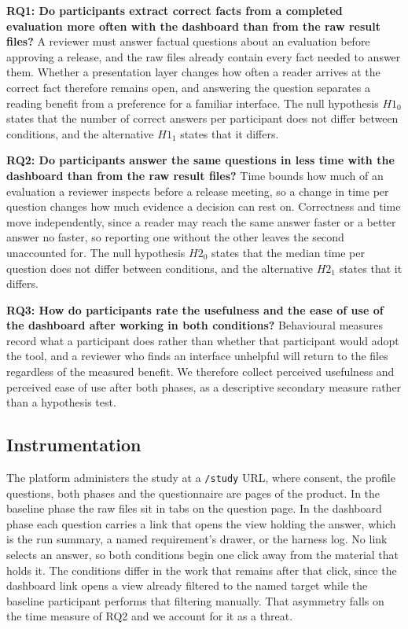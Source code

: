 \documentclass[10pt,conference]{IEEEtran}
\begin{document}
\textbf{RQ1: Do participants extract correct facts from a completed evaluation more often with the dashboard than from the raw result files?}
A reviewer must answer factual questions about an evaluation before approving a release, and the raw files already contain every fact needed to answer them.
Whether a presentation layer changes how often a reader arrives at the correct fact therefore remains open, and answering the question separates a reading benefit from a preference for a familiar interface.
The null hypothesis $H1_0$ states that the number of correct answers per participant does not differ between conditions, and the alternative $H1_1$ states that it differs.

\textbf{RQ2: Do participants answer the same questions in less time with the dashboard than from the raw result files?}
Time bounds how much of an evaluation a reviewer inspects before a release meeting, so a change in time per question changes how much evidence a decision can rest on.
Correctness and time move independently, since a reader may reach the same answer faster or a better answer no faster, so reporting one without the other leaves the second unaccounted for.
The null hypothesis $H2_0$ states that the median time per question does not differ between conditions, and the alternative $H2_1$ states that it differs.

\textbf{RQ3: How do participants rate the usefulness and the ease of use of the dashboard after working in both conditions?}
Behavioural measures record what a participant does rather than whether that participant would adopt the tool, and a reviewer who finds an interface unhelpful will return to the files regardless of the measured benefit.
We therefore collect perceived usefulness and perceived ease of use after both phases, as a descriptive secondary measure rather than a hypothesis test.

\subsection{Instrumentation}
The platform administers the study at a \texttt{/study} URL, where consent, the profile questions, both phases and the questionnaire are pages of the product.
In the baseline phase the raw files sit in tabs on the question page.
In the dashboard phase each question carries a link that opens the view holding the answer, which is the run summary, a named requirement's drawer, or the harness log.
No link selects an answer, so both conditions begin one click away from the material that holds it.
The conditions differ in the work that remains after that click, since the dashboard link opens a view already filtered to the named target while the baseline participant performs that filtering manually.
That asymmetry falls on the time measure of RQ2 and we account for it as a threat.
\end{document}
